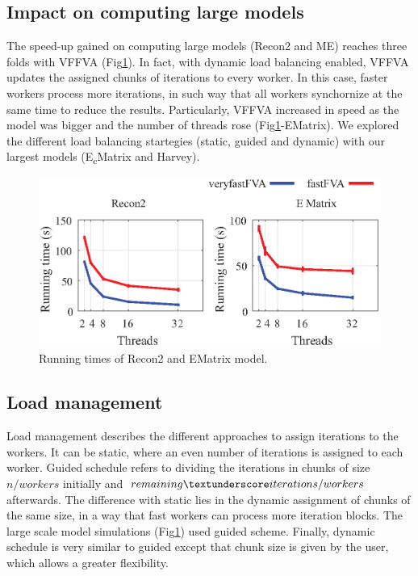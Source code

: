 \documentclass[letterpaper, 10 pt, conference]{ieeeconf}  %
\begin{document}
\subsection{Impact on computing large models}
The speed-up gained on computing large models (Recon2 and ME) reaches three folds with VFFVA (Fig\ref{fig:largemodel.}). In fact, with dynamic load balancing enabled, VFFVA updates the assigned chunks of iterations to every worker. In this case, faster workers process more iterations, in such way that all workers synchornize at the same time to reduce the results. Particularly, VFFVA increased in speed as the model was bigger and the number of threads rose (Fig\ref{fig:largemodel.}-E\textunderscore Matrix). We explored the different load balancing startegies (static, guided and dynamic) with our largest models (E\textsubscript{c}\textunderscore Matrix and Harvey).

\begin{figure}[!htb]
\centering
\includegraphics[scale=0.7]{figures/figure2/largemodels.eps}
\caption{Running times of Recon2 and E\textunderscore Matrix model.}
\label{fig:largemodel.}
\end{figure}

\subsection{Load management}
Load management describes the different approaches to assign iterations to the workers. It can be static, where an even number of iterations is assigned to each worker. Guided schedule refers to dividing the iterations in chunks of size $n/workers$ initially and $remaining\textunderscore iterations/workers$ afterwards. The difference with static lies in the dynamic assignment of chunks of the same size, in a way that fast workers can process more iteration blocks. The large scale model simulations (Fig\ref{fig:largemodel.}) used guided scheme. Finally, dynamic schedule is very similar to guided except that chunk size is given by the user, which allows a greater flexibility.
\end{document}
